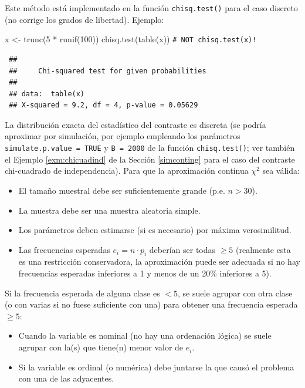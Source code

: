 \documentclass[
]{book}
\newenvironment{Shaded}{\begin{snugshade}}{\end{snugshade}}
\newcommand{\CommentTok}[1]{\textcolor[rgb]{0.56,0.35,0.01}{\textit{#1}}}
\newcommand{\DecValTok}[1]{\textcolor[rgb]{0.00,0.00,0.81}{#1}}
\newcommand{\FunctionTok}[1]{\textcolor[rgb]{0.00,0.00,0.00}{#1}}
\newcommand{\NormalTok}[1]{#1}
\newcommand{\OtherTok}[1]{\textcolor[rgb]{0.56,0.35,0.01}{#1}}
\newcommand{\SpecialCharTok}[1]{\textcolor[rgb]{0.00,0.00,0.00}{#1}}
\theoremstyle{break}
\theoremstyle{nonumberplain}
\renewcommand{\CommentTok}[1]{\textcolor[rgb]{0.41,0.41,0.41}{\texttt{#1}}}
\begin{document}
Este método está implementado en la función \texttt{chisq.test()} para el caso discreto (no corrige los grados de libertad).
Ejemplo:

\begin{Shaded}
\begin{Highlighting}[]
\NormalTok{x }\OtherTok{\textless{}{-}} \FunctionTok{trunc}\NormalTok{(}\DecValTok{5} \SpecialCharTok{*} \FunctionTok{runif}\NormalTok{(}\DecValTok{100}\NormalTok{))}
\FunctionTok{chisq.test}\NormalTok{(}\FunctionTok{table}\NormalTok{(x))            }\CommentTok{\# NOT \textquotesingle{}chisq.test(x)\textquotesingle{}!}
\end{Highlighting}
\end{Shaded}

\begin{verbatim}
 ## 
 ##     Chi-squared test for given probabilities
 ## 
 ## data:  table(x)
 ## X-squared = 9.2, df = 4, p-value = 0.05629
\end{verbatim}

La distribución exacta del estadístico del contraste es discreta (se podría aproximar por simulación, por ejemplo empleando los parámetros \texttt{simulate.p.value\ =\ TRUE} y \texttt{B\ =\ 2000} de la función \texttt{chisq.test()}; ver también el Ejemplo \ref{exm:chicuadind} de la Sección \ref{simconting} para el caso del contraste chi-cuadrado de independencia).
Para que la aproximación continua \(\chi^2\) sea válida:

\begin{itemize}
\item
  El tamaño muestral debe ser suficientemente grande (p.e. \(n>30\)).
\item
  La muestra debe ser una muestra aleatoria simple.
\item
  Los parámetros deben estimarse (si es necesario) por máxima
  verosimilitud.
\item
  Las frecuencias esperadas \(e_{i}=n\cdot p_{i}\) deberían ser todas
  \(\geq5\) (realmente esta es una restricción conservadora, la aproximación
  puede ser adecuada si no hay frecuencias esperadas inferiores a 1 y
  menos de un 20\% inferiores a 5).
\end{itemize}

Si la frecuencia esperada de alguna clase es \(<5\), se suele agrupar con otra
clase (o con varias si no fuese suficiente con una) para obtener una
frecuencia esperada \(\geq5\):

\begin{itemize}
\item
  Cuando la variable es nominal (no hay una ordenación lógica) se
  suele agrupar con la(s) que tiene(n) menor valor de \(e_{i}\).
\item
  Si la variable es ordinal (o numérica) debe juntarse la que causó el
  problema con una de las adyacentes.
\end{itemize}
\end{document}
